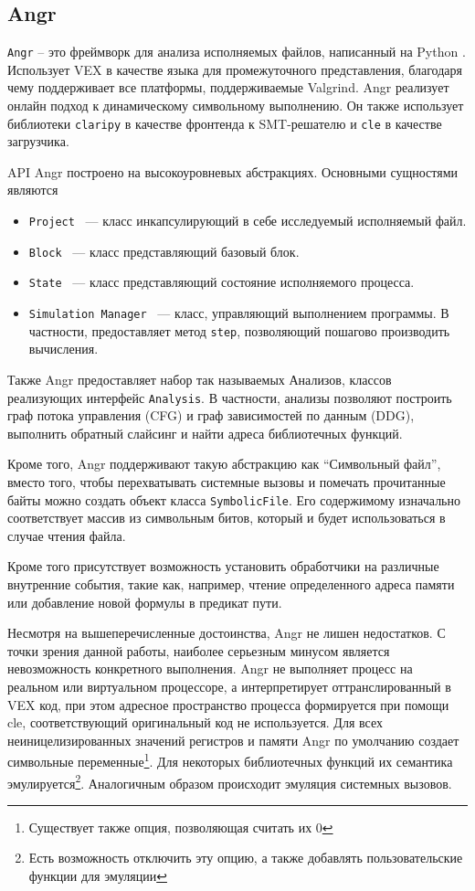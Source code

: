 \subsection{Angr}

\texttt{Angr} -- это фреймворк для анализа исполняемых файлов, написанный на Python \cite{Angr}. Использует VEX в качестве языка для промежуточного представления, благодаря чему поддерживает все платформы, поддерживаемые Valgrind.
Angr реализует онлайн подход к динамическому символьному выполнению. Он также использует библиотеки \texttt{claripy} в качестве фронтенда к SMT-решателю и \texttt{cle} в качестве загрузчика.

API Angr построено на высокоуровневых абстракциях. Основными сущностями являются
\begin{itemize}
    \item \texttt{Project} ~--- класс инкапсулирующий в себе исследуемый исполняемый файл.
    \item \texttt{Block} ~--- класс представляющий базовый блок.
    \item \texttt{State} ~--- класс представляющий состояние исполняемого процесса.
    \item \texttt{Simulation Manager} ~--- класс, управляющий выполнением программы. В частности, предоставляет метод \texttt{step}, позволяющий пошагово производить вычисления.
\end{itemize}

Также Angr предоставляет набор так называемых Анализов, классов реализующих интерфейс \texttt{Analysis}. В частности, анализы позволяют построить граф потока управления (CFG) и граф зависимостей по данным (DDG), выполнить обратный слайсинг и найти адреса библиотечных функций.

Кроме того, Angr поддерживают такую абстракцию как ``Символьный файл'', вместо того, чтобы перехватывать системные вызовы и помечать прочитанные байты можно создать объект класса \texttt{SymbolicFile}. Его содержимому изначально соответствует массив из символьным битов, который и будет использоваться в случае чтения файла.

Кроме того присутствует возможность установить обработчики на различные внутренние события, такие как, например, чтение определенного адреса памяти или добавление новой формулы в предикат пути.

Несмотря на вышеперечисленные достоинства, Angr не лишен недостатков. С точки зрения данной работы, наиболее серьезным минусом является невозможность конкретного выполнения. Angr не выполняет процесс на реальном или виртуальном процессоре, а интерпретирует оттранслированный в VEX код, при этом адресное пространство процесса формируется при помощи cle, соответствующий оригинальный код не используется. Для всех неиницелизированных значений регистров и памяти Angr по умолчанию создает символьные переменные\footnote{Существует также опция, позволяющая считать их 0}. Для некоторых библиотечных функций их семантика эмулируется\footnote{Есть возможность отключить эту опцию, а также добавлять пользовательские функции для эмуляции}. Аналогичным образом происходит эмуляция системных вызовов.


